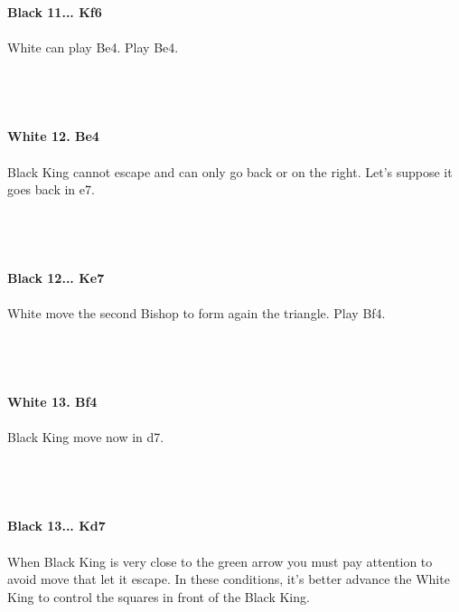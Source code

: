 \documentclass{article}
\begin{document}

\\
\\
\textbf{Black 11... Kf6}\\
\\
White can play Be4. Play Be4.\\\\
\\

\\
\\
\textbf{White 12. Be4}\\
\\
Black King cannot escape and can only go back or on the right. Let's suppose it goes back in e7.\\\\
\\

\\
\\
\textbf{Black 12... Ke7}\\
\\
White move the second Bishop to form again the triangle. Play Bf4.\\\\
\\

\\
\\
\textbf{White 13. Bf4}\\
\\
Black King move now in d7.\\\\
\\

\\
\\
\textbf{Black 13... Kd7}\\
\\
When Black King is very close to the green arrow you must pay attention to avoid move that let it escape. In these conditions, it's better advance the White King to control the squares in front of the Black King.\\\\
\\

\\
\end{document}
